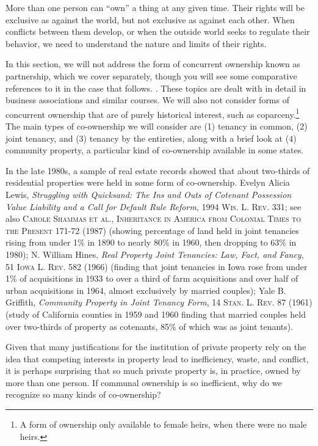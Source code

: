 More than one person can ``own'' a thing at any given time.  Their rights will
be exclusive as against the world, but not exclusive as against each other. 
When conflicts between them develop, or when the outside world seeks to
regulate their behavior, we need to understand the nature and limits of their
rights.

In this section, we will not address the form of concurrent ownership known as
partnership, which we cover separately, though you will see some comparative
references to it in the case that follows.
.  These topics are dealt with in detail in
business associations and similar courses.  We will also not consider forms of
concurrent ownership that are of purely historical interest, such as
coparceny.\footnote{A form of ownership only available to female heirs, when
there were no male heirs.}  The main types of co-ownership we will consider are
(1) tenancy in common, (2) joint tenancy, and (3) tenancy by the entireties,
along with a brief look at (4) community property, a particular kind of
co-ownership available in some states.

In the late 1980s, a sample of real estate records showed that about two-thirds
of residential properties were held in some form of co-ownership.  Evelyn Alicia
Lewis, \emph{Struggling with Quicksand: The Ins and Outs of Cotenant Possession
Value Liability and a Call for Default Rule Reform}, 1994 \textsc{Wis. L. Rev.}
331; see also \textsc{Carole Shammas et al.}, \textsc{Inheritance in America
from Colonial Times to the Present} 171-72 (1987) (showing percentage of land
held in joint tenancies rising from under 1\% in 1890 to nearly 80\% in 1960,
then dropping to 63\% in 1980); N. William Hines, \emph{Real Property Joint
Tenancies: Law, Fact, and Fancy}, 51 \textsc{Iowa L. Rev.} 582 (1966) (finding
that joint tenancies in Iowa rose from under 1\% of acquisitions in 1933 to over
a third of farm acquisitions and over half of urban acquisitions in 1964, almost
exclusively by married couples); Yale B. Griffith, \emph{Community Property in
Joint Tenancy Form}, 14 \textsc{Stan. L. Rev.} 87 (1961) (study of California
counties in 1959 and 1960 finding that married couples held over two-thirds of
property as cotenants, 85\% of which was as joint tenants).  

Given that many justifications for the institution of private property rely on
the idea that competing interests in property lead to inefficiency, waste, and
conflict, it is perhaps surprising that so much private property is, in
practice, owned by more than one person.  If communal ownership is so
inefficient, why do we recognize so many kinds of co-ownership?  

